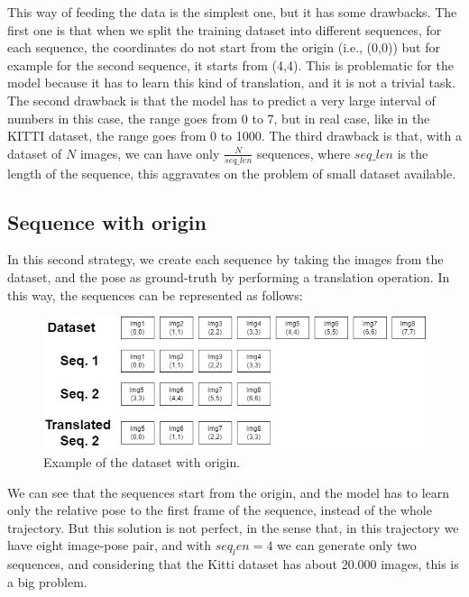 This way of feeding the data is the simplest one, but it has some drawbacks.
The first one is that when we split the training dataset into different sequences, for each sequence, the coordinates do not start from the origin (i.e., (0,0)) but for example for the second sequence, it starts from (4,4).
This is problematic for the model because it has to learn this kind of translation, and it is not a trivial task.
The second drawback is that the model has to predict a very large interval of numbers in this case, the range goes from 0 to 7, but in real case, like in the KITTI dataset, the range goes from 0 to 1000.
The third drawback is that, with a dataset of $N$ images, we can have only $\frac{N}{seq\_len}$ sequences, where $seq\_len$ is the length of the sequence, this aggravates on the problem of small dataset available.


\subsection{Sequence with origin}\label{subsec:sequence-with-origin}
In this second strategy, we create each sequence by taking the images from the dataset, and the pose as ground-truth by performing a translation operation.
In this way, the sequences can be represented as follows:
\begin{figure}[H]
    \centering
    \includegraphics[width=\textwidth]{images/4_2_split_traj_1}
    \caption{Example of the dataset with origin.}
    \label{fig:example-of-dataset-with-origin}
\end{figure}
We can see that the sequences start from the origin, and the model has to learn only the relative pose to the first frame of the sequence, instead of the whole trajectory.
But this solution is not perfect, in the sense that, in this trajectory we have eight image-pose pair, and with $seq_len = 4$ we can generate only two sequences, and considering that the Kitti dataset has about 20.000 images, this is a big problem.


